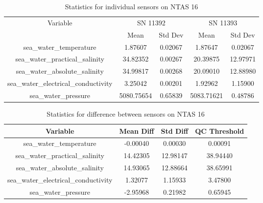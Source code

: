 \begin{table}[h]
\centering
\begin{tabular}{|c|c|c|c|c|}
\hline
Variable & \multicolumn{2}{c|}{SN 11392} & \multicolumn{2}{c|}{SN 11393} \\
& Mean & Std Dev & Mean & Std Dev \\
\hline
sea\_water\_temperature & 1.87607 & 0.02067 & 1.87647 & 0.02067 \\
sea\_water\_practical\_salinity & 34.82352 & 0.00267 & 20.39875 & 12.97971 \\
sea\_water\_absolute\_salinity & 34.99817 & 0.00268 & 20.09010 & 12.88980 \\
sea\_water\_electrical\_conductivity & 3.25042 & 0.00201 & 1.92962 & 1.15900 \\
sea\_water\_pressure & 5080.75654 & 0.65839 & 5083.71621 & 0.48786 \\
\hline
\end{tabular}
\caption{Statistics for individual sensors on NTAS 16}
\end{table}

\begin{table}[h]
\centering
\begin{tabular}{|c|c|c|c|}
\hline
Variable & Mean Diff & Std Diff & QC Threshold \\
\hline
sea\_water\_temperature & -0.00040 & 0.00030 & 0.00091 \\
sea\_water\_practical\_salinity & 14.42305 & 12.98147 & 38.94440 \\
sea\_water\_absolute\_salinity & 14.93065 & 12.88664 & 38.65991 \\
sea\_water\_electrical\_conductivity & 1.32077 & 1.15933 & 3.47800 \\
sea\_water\_pressure & -2.95968 & 0.21982 & 0.65945 \\
\hline
\end{tabular}
\caption{Statistics for difference between sensors on NTAS 16}
\end{table}
